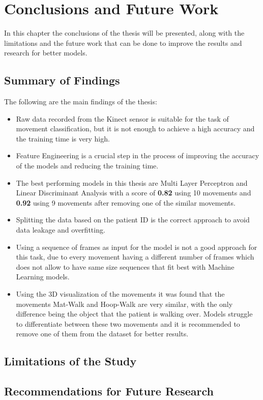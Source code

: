 %
%
\chapter{Conclusions and Future Work}
    In this chapter the conclusions of the thesis will be presented, along with the limitations and the future work that can be done to improve the results and research for better models.
    \section{Summary of Findings}
        The following are the main findings of the thesis:
        \begin{itemize}
            \item Raw data recorded from the Kinect sensor is suitable for the task of movement classification, but it is not enough to achieve a high accuracy and the training time is very high.
            \item Feature Engineering is a crucial step in the process of improving the accuracy of the models and reducing the training time. 
            \item The best performing models in this thesis are Multi Layer Perceptron and Linear Discriminant Analysis with a score of \textbf{0.82} using 10 movements and \textbf{0.92} using 9 movements after removing one of the similar movements.
            \item Splitting the data based on the patient ID is the correct approach to avoid data leakage and overfitting. 
            \item Using a sequence of frames as input for the model is not a good approach for this task, due to every movement having a different number of frames which does not allow to have same size sequences that fit best with Machine Learning models.
            \item Using the 3D visualization of the movements it was found that the movements Mat-Walk and Hoop-Walk are very similar, with the only difference being the object that the patient is walking over. Models struggle to differentiate between these two movements and it is recommended to remove one of them from the dataset for better results.
        \end{itemize}
    \section{Limitations of the Study}
    
    \section{Recommendations for Future Research}
\cleardoublepage